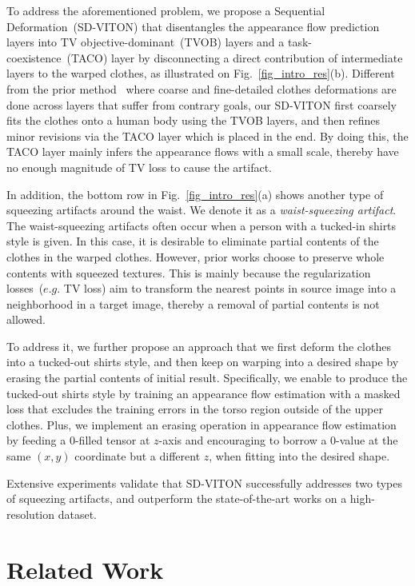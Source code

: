 \documentclass[letterpaper]{article} %
\begin{document}
To address the aforementioned problem, we propose a Sequential Deformation~(SD-VITON) that disentangles the appearance flow prediction layers into TV objective-dominant~(TVOB) layers and a task-coexistence~(TACO) layer by disconnecting a direct contribution of intermediate layers to the warped clothes, as illustrated on Fig.~\ref{fig_intro_res}(b). 
Different from the prior method~\cite{lee2022hrviton} where coarse and fine-detailed clothes deformations are done across layers that suffer from contrary goals, our SD-VITON first coarsely fits the clothes onto a human body using the TVOB layers, and then refines minor revisions via the TACO layer which is placed in the end.
By doing this, the TACO layer mainly infers the appearance flows with a small scale, thereby have no enough magnitude of TV loss to cause the artifact.

In addition, the bottom row in Fig.~\ref{fig_intro_res}(a) shows another type of squeezing artifacts around the waist.
We denote it as a \textit{waist-squeezing artifact}.
The waist-squeezing artifacts often occur when a person with a tucked-in shirts style is given.
In this case, it is desirable to eliminate partial contents of the clothes in the warped clothes.
However, prior works choose to preserve whole contents with squeezed textures.
This is mainly because the regularization losses~($e.g.$ TV loss) aim to transform the nearest points in source image into a neighborhood in a target image, thereby a removal of partial contents is not allowed.

To address it, we further propose an approach that we first deform the clothes into a tucked-out shirts style, and then keep on warping into a desired shape by erasing the partial contents of initial result.
Specifically, we enable to produce the tucked-out shirts style by training an appearance flow estimation with a masked loss that excludes the training errors in the torso region outside of the upper clothes.
Plus, we implement an erasing operation in appearance flow estimation by feeding a 0-filled tensor at $z$-axis and encouraging to borrow a 0-value at the same $(x,y)$ coordinate but a different $z$, when fitting into the desired shape.

Extensive experiments validate that SD-VITON successfully addresses two types of squeezing artifacts, and outperform the state-of-the-art works on a high-resolution dataset.


\section{Related Work}
\label{sec_related_work}
\end{document}
